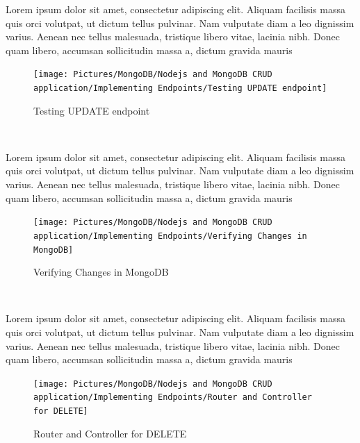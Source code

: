 \begin{spacing}{1.2}
\par Lorem ipsum dolor sit amet, consectetur adipiscing elit. Aliquam facilisis massa quis orci volutpat, ut dictum tellus pulvinar. Nam vulputate diam a leo dignissim varius. Aenean nec tellus malesuada, tristique libero vitae, lacinia nibh. Donec quam libero, accumsan sollicitudin massa a, dictum gravida mauris
\\
\begin{figure}[!htb] 
\begin{center} 
\texttt{[image: Pictures/MongoDB/Nodejs and MongoDB CRUD  application/Implementing Endpoints/Testing UPDATE endpoint]} 
\end{center} 
\caption{Testing UPDATE endpoint} 
\end{figure}  \FloatBarrier
\\

\par Lorem ipsum dolor sit amet, consectetur adipiscing elit. Aliquam facilisis massa quis orci volutpat, ut dictum tellus pulvinar. Nam vulputate diam a leo dignissim varius. Aenean nec tellus malesuada, tristique libero vitae, lacinia nibh. Donec quam libero, accumsan sollicitudin massa a, dictum gravida mauris
\\
\begin{figure}[!htb] 
\begin{center} 
\texttt{[image: Pictures/MongoDB/Nodejs and MongoDB CRUD  application/Implementing Endpoints/Verifying Changes in MongoDB]} 
\end{center} 
\caption{Verifying Changes in MongoDB} 
\end{figure}  \FloatBarrier
\\

\par Lorem ipsum dolor sit amet, consectetur adipiscing elit. Aliquam facilisis massa quis orci volutpat, ut dictum tellus pulvinar. Nam vulputate diam a leo dignissim varius. Aenean nec tellus malesuada, tristique libero vitae, lacinia nibh. Donec quam libero, accumsan sollicitudin massa a, dictum gravida mauris
\\
\begin{figure}[!htb] 
\begin{center} 
\texttt{[image: Pictures/MongoDB/Nodejs and MongoDB CRUD  application/Implementing Endpoints/Router and Controller for DELETE]} 
\end{center} 
\caption{Router and Controller for DELETE} 
\end{figure}  \FloatBarrier
\\


\end{spacing}
